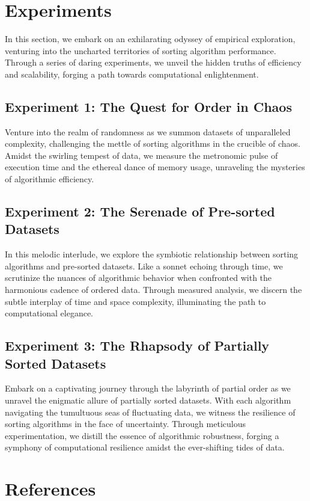 \documentclass{article}
\begin{document}
\section{Experiments}

In this section, we embark on an exhilarating odyssey of empirical exploration, venturing into the uncharted territories of sorting algorithm performance. Through a series of daring experiments, we unveil the hidden truths of efficiency and scalability, forging a path towards computational enlightenment.

\subsection{Experiment 1: The Quest for Order in Chaos}
Venture into the realm of randomness as we summon datasets of unparalleled complexity, challenging the mettle of sorting algorithms in the crucible of chaos. Amidst the swirling tempest of data, we measure the metronomic pulse of execution time and the ethereal dance of memory usage, unraveling the mysteries of algorithmic efficiency.

\subsection{Experiment 2: The Serenade of Pre-sorted Datasets}
In this melodic interlude, we explore the symbiotic relationship between sorting algorithms and pre-sorted datasets. Like a sonnet echoing through time, we scrutinize the nuances of algorithmic behavior when confronted with the harmonious cadence of ordered data. Through measured analysis, we discern the subtle interplay of time and space complexity, illuminating the path to computational elegance.

\subsection{Experiment 3: The Rhapsody of Partially Sorted Datasets}
Embark on a captivating journey through the labyrinth of partial order as we unravel the enigmatic allure of partially sorted datasets. With each algorithm navigating the tumultuous seas of fluctuating data, we witness the resilience of sorting algorithms in the face of uncertainty. Through meticulous experimentation, we distill the essence of algorithmic robustness, forging a symphony of computational resilience amidst the ever-shifting tides of data.

\section{References}
\end{document}
